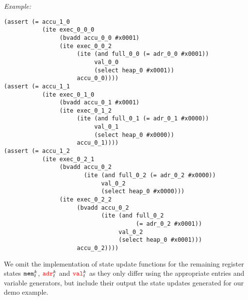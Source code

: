 \noindent
\emph{Example:} 

\begin{lstlisting}[style=smtlib]
(assert (= accu_1_0
           (ite exec_0_0_0
                (bvadd accu_0_0 #x0001)
                (ite exec_0_0_2
                     (ite (and full_0_0 (= adr_0_0 #x0001))
                          val_0_0
                          (select heap_0 #x0001))
                     accu_0_0))))
(assert (= accu_1_1
           (ite exec_0_1_0
                (bvadd accu_0_1 #x0001)
                (ite exec_0_1_2
                     (ite (and full_0_1 (= adr_0_1 #x0000))
                          val_0_1
                          (select heap_0 #x0000))
                     accu_0_1))))
(assert (= accu_1_2
           (ite exec_0_2_1
                (bvadd accu_0_2
                       (ite (and full_0_2 (= adr_0_2 #x0000))
                            val_0_2
                            (select heap_0 #x0000)))
                (ite exec_0_2_2
                     (bvadd accu_0_2
                            (ite (and full_0_2
                                      (= adr_0_2 #x0001))
                                 val_0_2
                                 (select heap_0 #x0001)))
                     accu_0_2))))
\end{lstlisting}


\noindent
We omit the implementation of state update functions for the remaining register states $\texttt{mem}^k_t$, ${\color{red}\texttt{adr}}^k_t$ and ${\color{red}\texttt{val}}^k_t$ as they only differ  using the appropriate  entries and variable generators, but include their output  the state updates generated for our demo example.


